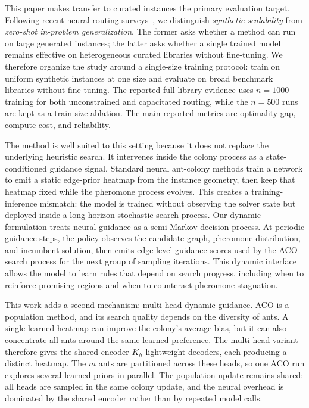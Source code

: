 \documentclass[11pt]{article}
\begin{document}
This paper makes transfer to curated instances the primary evaluation target.
Following recent neural routing surveys~\cite{nrs-survey}, we distinguish \emph{synthetic scalability} from \emph{zero-shot in-problem generalization}.
The former asks whether a method can run on large generated instances; the latter asks whether a single trained model remains effective on heterogeneous curated libraries without fine-tuning.
We therefore organize the study around a single-size training protocol: train on uniform synthetic instances at one size and evaluate on broad benchmark libraries without fine-tuning.
The reported full-library evidence uses $n=1000$ training for both unconstrained and capacitated routing, while the $n=500$ runs are kept as a train-size ablation.
The main reported metrics are optimality gap, compute cost, and reliability.

The method is well suited to this setting because it does not replace the underlying heuristic search.
It intervenes inside the colony process as a state-conditioned guidance signal.
Standard neural ant-colony methods train a network to emit a static edge-prior heatmap from the instance geometry, then keep that heatmap fixed while the pheromone process evolves.
This creates a training-inference mismatch: the model is trained without observing the solver state but deployed inside a long-horizon stochastic search process.
Our dynamic formulation treats neural guidance as a semi-Markov decision process.
At periodic guidance steps, the policy observes the candidate graph, pheromone distribution, and incumbent solution, then emits edge-level guidance scores used by the ACO search process for the next group of sampling iterations.
This dynamic interface allows the model to learn rules that depend on search progress, including when to reinforce promising regions and when to counteract pheromone stagnation.

This work adds a second mechanism: multi-head dynamic guidance.
ACO is a population method, and its search quality depends on the diversity of ants.
A single learned heatmap can improve the colony's average bias, but it can also concentrate all ants around the same learned preference.
The multi-head variant therefore gives the shared encoder $K_h$ lightweight decoders, each producing a distinct heatmap.
The $m$ ants are partitioned across these heads, so one ACO run explores several learned priors in parallel.
The population update remains shared: all heads are sampled in the same colony update, and the neural overhead is dominated by the shared encoder rather than by repeated model calls.
\end{document}
